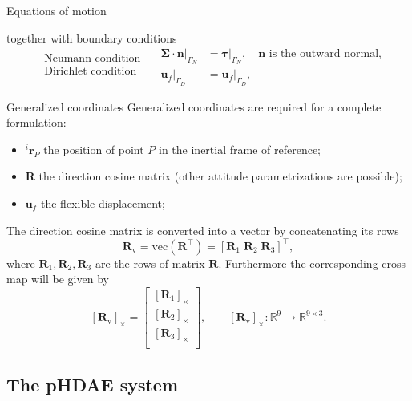 \documentclass[aspectratio=169]{ISAE-Beamer}
\newcommand{\crmat}[1]{\ensuremath{[#1]_{\times}}}
\begin{document}
\begin{frame}{Equations of motion}
\begin{overlayarea}{\textwidth}{0.8\textheight}
{		together with boundary conditions
		\begin{equation*}
		\begin{aligned}
		&\text{Neumann condition} \\
		&\text{Dirichlet condition} \\
		\end{aligned} \quad
		\begin{aligned}
		\bm\Sigma \cdot \bm{n}|_{\Gamma_N} &= \bm\tau|_{\Gamma_N}, \quad \text{$\bm{n}$ is the outward normal,} \\
		\bm{u}_f|_{\Gamma_D} &= \bm{\bar{u}}_f|_{\Gamma_D},
		\end{aligned}
		\end{equation*}
	}
\end{overlayarea}
\end{frame}


\begin{frame}{Generalized coordinates}
Generalized coordinates are required for a complete formulation:
\begin{itemize}
\item $^i \bm{r}_P$ the position of point $P$ in the inertial frame of reference;
\item $\bm{R}$ the direction cosine matrix (other attitude parametrizations are possible);
\item $\bm{u}_f$ the flexible displacement;
\end{itemize}
The direction cosine matrix is converted into a vector by concatenating its rows
\begin{equation*}
\bm{R}_{\text{v}} = \text{vec}(\bm{R}^\top) = [\bm{R}_1 \; \bm{R}_2 \; \bm{R}_3]^\top,
\end{equation*}
where $\bm{R}_{1}, \bm{R}_{2}, \bm{R}_{3}$ are the rows of matrix $\bm{R}$. Furthermore the corresponding cross map will be given by
\begin{equation*}
\crmat{\bm{R}_{\text{v}}} = 
\begin{bmatrix}
\crmat{\bm{R}_1} \\
\crmat{\bm{R}_2} \\
\crmat{\bm{R}_3} \\
\end{bmatrix}, \qquad 
\crmat{\bm{R}_{\text{v}}} : \mathbb{R}^9 \rightarrow \mathbb{R}^{9 \times 3}.
\end{equation*}
\end{frame}

\subsection{The pHDAE system}
\end{document}
